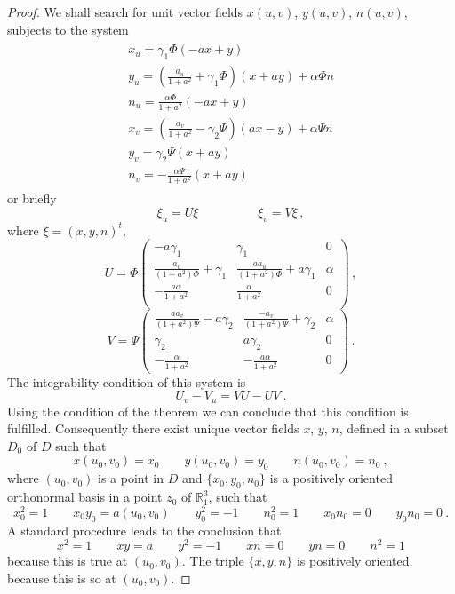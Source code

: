 \documentclass[10pt,a4paper]{amsart}
\newcommand{\ds}{\displaystyle}
\begin{document}
\begin{proof}

We shall search for unit vector fields $x(u,v)$, $y(u,v)$, $n(u,v)$, subjects to the system
\begin{equation} \label{eq:MainEquationsInTheBonetTheorem}
	\begin{array}{l}
		\begin{array}{l}
		\ds x_u=\gamma_1\Phi(-ax+y)  \\
		\ds y_u=\left(\frac{a_u}{1+a^2}+\gamma_1\Phi\right)(x+ay)  +\alpha\Phi n \\
		\ds n_u=\frac{\alpha\Phi}{1+a^2}(-ax+y)    \\
		\ds x_v=\left(\frac{a_v}{1+a^2}-\gamma_2\Psi\right)(ax-y)+\alpha\Psi n   \\
		\ds y_v=\gamma_2\Psi(x+ay ) \\		
		\ds n_v=-\frac{\alpha\Psi}{1+a^2}(x+ay) 
	\end{array}
	\end{array}
\end{equation}
or briefly
$$
	\xi_u=U\xi \hspace{2cm} \xi_v=V\xi  \,,
$$
where
$\xi=(x,y,n)^t$,
$$
	U=\Phi\left(
			\begin{array}{ccc}
				\ds -a\gamma_1    & \gamma_1   &   0  \\
				\ds \frac{a_u}{(1+a^2)\Phi}+\gamma_1   & \ds \frac{aa_u}{(1+a^2)\Phi}+a\gamma_1  & \alpha  \\
				\ds -\frac{a\alpha}{1+a^2}   & \ds \frac{\alpha}{1+a^2}   &   0  \\
				\end{array}
		\right)      \,,
$$
$$
	V=\Psi\left(
			\begin{array}{ccc}
				\ds \frac{aa_v}{(1+a^2)\Psi}-a\gamma_2  & \ds \frac{-a_v}{(1+a^2)\Psi}+\gamma_2  & \alpha   \\
				\ds \gamma_2 & a\gamma_2 &  0  \\		
				\ds -\frac{\alpha}{1+a^2}  &  \ds -\frac{a\alpha}{1+a^2} &  0
			\end{array}
		\right) \,.
$$
The integrability condition of this system is
$$
	U_v-V_u=VU-UV \ .
$$
Using the condition of the theorem we can conclude that this condition is fulfilled.
Consequently there exist unique vector fields $x$, $y$, $n$, defined in a
subset $D_0$ of $D$ such that
$$
	x(u_0,v_0)=x_0 \qquad y(u_0,v_0)=y_0  \qquad n(u_0,v_0)=n_0 \ ,
$$ 
where $(u_0,v_0)$ is a point in $D$ and $\{x_0,y_0,n_0\}$ is a positively oriented orthonormal basis in a point $z_0$ of $\mathbb R^3_1$, such that 
$$
	x_0^2=1   \qquad   x_0y_0=a(u_0,v_0) \qquad y_0^2=-1   \qquad   n_0^2=1   \qquad  x_0n_0=0  \qquad  y_0n_0=0   \ .
$$
A standard procedure leads to the conclusion that 
$$
	x^2=1   \qquad   xy=a \qquad y^2=-1  \qquad  xn=0  \qquad  yn=0    \qquad   n^2=1  
$$
because this is true at $(u_0,v_0)$. 
The triple $\{x,y,n\}$ is positively oriented, because this is so at $(u_0,v_0)$.


\end{proof}
\end{document}
